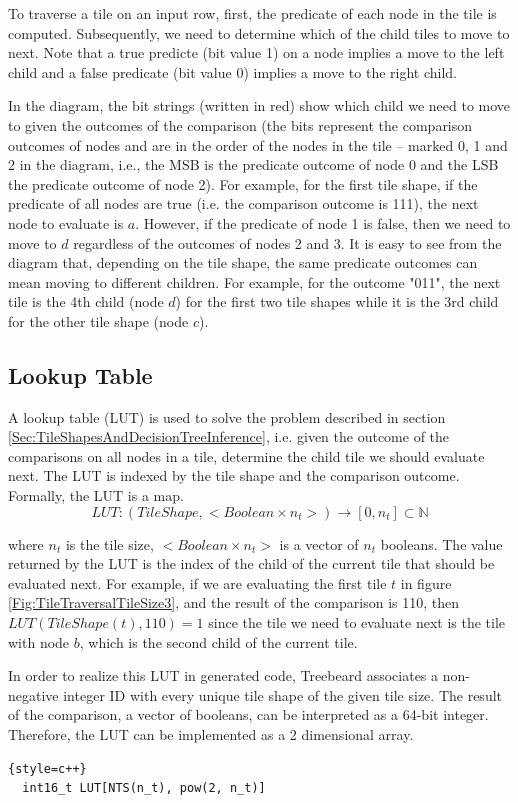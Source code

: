 To traverse a tile on an input row, first, the predicate of each node in the tile is computed. Subsequently, we need to determine which of the child tiles to move to next. Note that a true predicte (bit value 1) on a node implies a move to the left child and a false predicate (bit value 0) implies a move to the right child.

In the diagram, the bit strings (written in red) show which child we need to move to given the outcomes of the comparison (the bits represent the comparison outcomes of nodes and are in the order of the nodes in the tile -- marked 0, 1 and 2 in the diagram, i.e., the MSB is the predicate outcome of node 0 and the LSB the predicate outcome of node 2). For example, for the first tile shape, if the predicate of all nodes are true (i.e. the comparison outcome is 111), the next node to evaluate is $a$. However, if the predicate of node 1 is false, then we need to move to $d$ regardless of the outcomes of nodes 2 and 3. It is easy to see from the diagram that, depending on the tile shape, the same predicate outcomes can mean moving to different children. For example, for the outcome "011", the next tile is the 4th child (node $d$) for the first two tile shapes while it is the 3rd child for the other tile shape (node $c$).

\subsection{Lookup Table}
\label{sec:LookupTable}
A lookup table (LUT) is used to solve the problem described in section \ref{Sec:TileShapesAndDecisionTreeInference}, i.e. given the outcome of the comparisons on all nodes in a tile, determine the child tile we should evaluate next. The LUT is indexed by the tile shape and the comparison outcome. Formally, the LUT is a map.
\[
LUT : (TileShape, < Boolean \times n_t >) \rightarrow [0, n_t] \subset \mathbb{N}
\]

where $n_t$ is the tile size, $< Boolean \times n_t >$ is a vector of $n_t$ booleans. The value returned by the LUT is the index of the child of the current tile that should be evaluated next. For example, if we are evaluating the first tile $t$ in figure \ref{Fig:TileTraversalTileSize3}, and the result of the comparison is 110, then $LUT(TileShape(t), 110)=1$ since the tile we need to evaluate next is the tile with node $b$, which is the second child of the current tile.

In order to realize this LUT in generated code, Treebeard associates a non-negative integer ID with every unique tile shape of the given tile size. The result of the comparison, a vector of booleans, can be interpreted as a 64-bit integer. Therefore, the LUT can be implemented as a 2 dimensional array.
\begin{lstlisting}{style=c++}
  int16_t LUT[NTS(n_t), pow(2, n_t)]  
\end{lstlisting}

